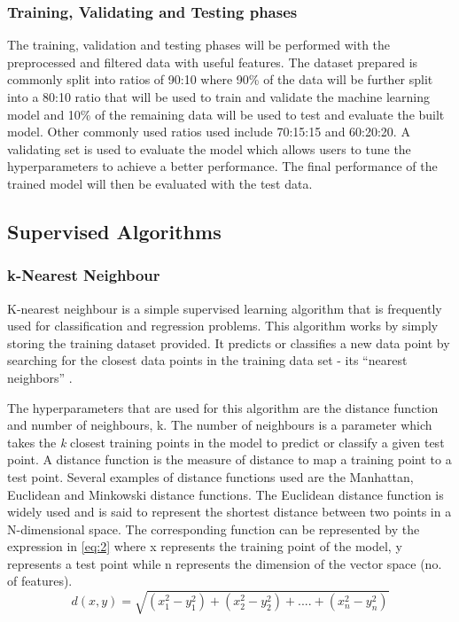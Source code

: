 \subsubsection{Training, Validating and Testing phases}
The training, validation and testing phases will be performed with the preprocessed and filtered data with useful features. The dataset prepared is commonly split into ratios of 90:10 where 90\% of the data will be further split into a 80:10 ratio that will be used to train and validate the machine learning model and 10\% of the remaining data will be used to test and evaluate the built model. Other commonly used ratios used include 70:15:15 and 60:20:20. A validating set is used to evaluate the model which allows users to tune the hyperparameters to achieve a better performance. The final performance of the trained model will then be evaluated with the test data. 
\subsection{Supervised Algorithms}

\subsubsection{k-Nearest Neighbour}
K-nearest neighbour is a simple supervised learning algorithm that is frequently used for classification and regression problems. This algorithm works by simply storing the training dataset provided. It predicts or classifies a new data point by searching for the closest data points in the training data set - its ``nearest neighbors'' \cite{muller_guido_2016}.

The hyperparameters that are used for this algorithm are the distance function and number of neighbours, k. The number of neighbours is a parameter which takes the \textit{k} closest training points in the model to predict or classify a given test point. A distance function is the measure of distance to map a training point to a test point. Several examples of distance functions used are the Manhattan, Euclidean and Minkowski distance functions. The Euclidean distance function is widely used and is said to represent the shortest distance between two points in a N-dimensional space. The corresponding function can be represented by the expression in 
\ref{eq:2} where x represents the training point of the model, y represents a test point while n represents the dimension of the vector space (no. of features). 
\begin{equation}
    d(x,y) = \sqrt{(x_1^2-y_1^2)+(x_2^2-y_2^2)+....+(x_n^2-y_n^2)} \label{eq:2}
\end{equation}

